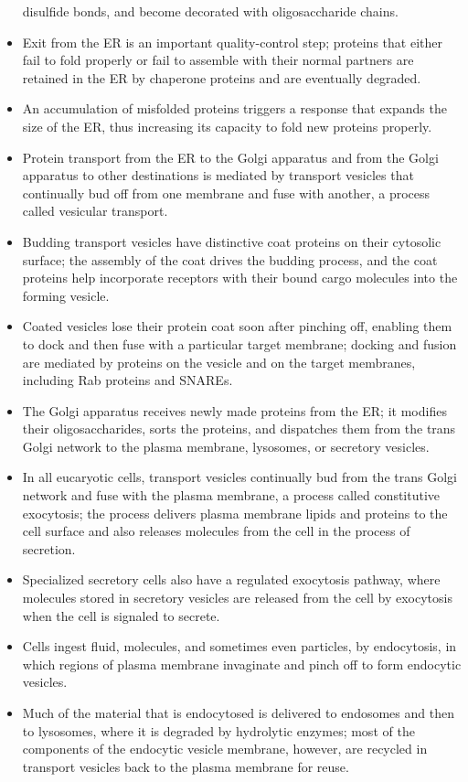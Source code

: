\begin{itemize}
disulfide bonds, and become decorated with oligosaccharide chains.
\item Exit from the ER is an important quality-control step; proteins that
either fail to fold properly or fail to assemble with their normal partners 
are retained in the ER by chaperone proteins and are eventually
degraded.
\item An accumulation of misfolded proteins triggers a response that
expands the size of the ER, thus increasing its capacity to fold new
proteins properly.
\item Protein transport from the ER to the Golgi apparatus and from the
Golgi apparatus to other destinations is mediated by transport vesicles 
that continually bud off from one membrane and fuse with
another, a process called vesicular transport.
\item Budding transport vesicles have distinctive coat proteins on their
cytosolic surface; the assembly of the coat drives the budding process, 
and the coat proteins help incorporate receptors with their
bound cargo molecules into the forming vesicle.
\item Coated vesicles lose their protein coat soon after pinching off, enabling 
them to dock and then fuse with a particular target membrane;
docking and fusion are mediated by proteins on the vesicle and on
the target membranes, including Rab proteins and SNAREs.
\item The Golgi apparatus receives newly made proteins from the ER; it
modifies their oligosaccharides, sorts the proteins, and dispatches
them from the trans Golgi network to the plasma membrane, lysosomes, 
or secretory vesicles.
\item In all eucaryotic cells, transport vesicles continually bud from the
trans Golgi network and fuse with the plasma membrane, a process
called constitutive exocytosis; the process delivers plasma membrane
lipids and proteins to the cell surface and also releases molecules
from the cell in the process of secretion.
\item Specialized secretory cells also have a regulated exocytosis pathway,
where molecules stored in secretory vesicles are released from the
cell by exocytosis when the cell is signaled to secrete.
\item Cells ingest fluid, molecules, and sometimes even particles, by endocytosis, 
in which regions of plasma membrane invaginate and pinch
off to form endocytic vesicles.
\item Much of the material that is endocytosed is delivered to endosomes
and then to lysosomes, where it is degraded by hydrolytic enzymes;
most of the components of the endocytic vesicle membrane, however, 
are recycled in transport vesicles back to the plasma membrane
for reuse.
\end{itemize}















